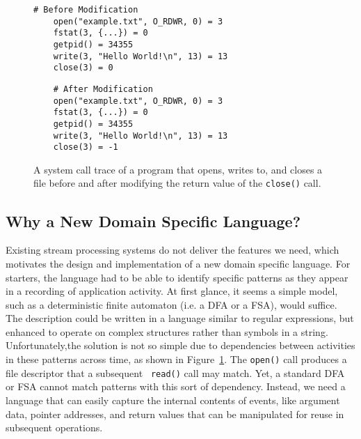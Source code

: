 \begin{figure}[t]
\begin{minipage}{.5\textwidth}
  \begin{lstlisting}[gobble=4]
    # Before Modification
    open("example.txt", O_RDWR, 0) = 3
    fstat(3, {...}) = 0
    getpid() = 34355
    write(3, "Hello World!\n", 13) = 13
    close(3) = 0
  \end{lstlisting}
 \end{minipage}%
 \begin{minipage}{.5\textwidth}
  \begin{lstlisting}
    # After Modification
    open("example.txt", O_RDWR, 0) = 3
    fstat(3, {...}) = 0
    getpid() = 34355
    write(3, "Hello World!\n", 13) = 13
    close(3) = -1
  \end{lstlisting}
  \end{minipage}
  \caption{A system call trace of a program that opens, writes to, and closes
  a file before and after modifying the return value of the \texttt{close()} call.}
  \label{fig:StraceListing}
\end{figure}

\subsection{Why a New Domain Specific Language?}


Existing stream processing systems do not deliver the features we need, which motivates the design and implementation of a new domain specific language. For starters, the language  had to be able to identify specific
patterns as they appear in a recording of application activity.
At first glance, it seems a simple model,
such as a deterministic finite automaton (i.e. a DFA or a FSA), would suffice.
The description could be written
in a language similar to
regular expressions, but enhanced to operate on complex
structures rather than symbols in a string.
Unfortunately,the solution is not so simple due to  dependencies
between activities in these patterns
across time,
as shown in Figure~\ref{fig:StraceListing}.
The {\tt open()} call produces a file descriptor that a subsequent {\tt
read()} call may match.
Yet, a standard DFA or FSA cannot match patterns with this sort of dependency. 
Instead, we need a language
that can easily capture
the internal contents of events,
like argument data,
pointer addresses,
and return values that can be
manipulated for
reuse in subsequent operations.

